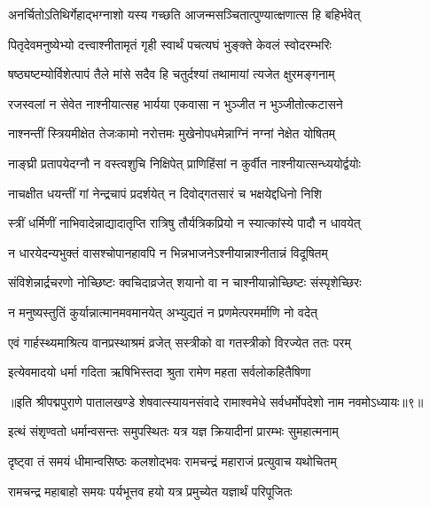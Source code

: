 \twolineshloka
{अनर्चितोऽतिथिर्गेहाद्भग्नाशो यस्य गच्छति}
{आजन्मसञ्चितात्पुण्यात्क्षणात्स हि बहिर्भवेत्}%

\twolineshloka
{पितृदेवमनुष्येभ्यो दत्त्वाश्नीतामृतं गृही}
{स्वार्थं पचत्यघं भुङ्क्ते केवलं स्वोदरम्भरिः}%

\twolineshloka
{षष्ठ्यष्टम्योर्विशेत्पापं तैले मांसे सदैव हि}
{चतुर्दश्यां तथामायां त्यजेत क्षुरमङ्गनाम्}%

\twolineshloka
{रजस्वलां न सेवेत नाश्नीयात्सह भार्यया}
{एकवासा न भुञ्जीत न भुञ्जीतोत्कटासने}%

\twolineshloka
{नाश्नन्तीं स्त्रियमीक्षेत तेजःकामो नरोत्तमः}
{मुखेनोपधमेन्नाग्निं नग्नां नेक्षेत योषितम्}%

\twolineshloka
{नाङ्घ्री प्रतापयेदग्नौ न वस्त्वशुचि निक्षिपेत्}
{प्राणिहिंसां न कुर्वीत नाश्नीयात्सन्ध्ययोर्द्वयोः}%

\twolineshloka
{नाचक्षीत धयन्तीं गां नेन्द्रचापं प्रदर्शयेत्}
{न दिवोद्गतसारं च भक्षयेद्दधिनो निशि}%

\twolineshloka
{स्त्रीं धर्मिणीं नाभिवादेन्नाद्यादातृप्ति रात्रिषु}
{तौर्यत्रिकप्रियो न स्यात्कांस्ये पादौ न धावयेत्}%

\twolineshloka
{न धारयेदन्यभुक्तं वासश्चोपानहावपि}
{न भिन्नभाजनेऽश्नीयान्नाश्नीतान्नं विदूषितम्}%

\twolineshloka
{संविशेन्नार्द्रचरणो नोच्छिष्टः क्वचिदाव्रजेत्}
{शयानो वा न चाश्नीयान्नोच्छिष्टः संस्पृशेच्छिरः}%

\twolineshloka
{न मनुष्यस्तुतिं कुर्यान्नात्मानमवमानयेत्}
{अभ्युद्यतं न प्रणमेत्परमर्माणि नो वदेत्}%

\twolineshloka
{एवं गार्हस्थ्यमाश्रित्य वानप्रस्थाश्रमं व्रजेत्}
{सस्त्रीको वा गतस्त्रीको विरज्येत ततः परम्}%

\twolineshloka
{इत्येवमादयो धर्मा गदिता ऋषिभिस्तदा}
{श्रुता रामेण महता सर्वलोकहितैषिणा}%

॥इति श्रीपद्मपुराणे पातालखण्डे शेषवात्स्यायनसंवादे रामाश्वमेधे सर्वधर्मोपदेशो नाम नवमोऽध्यायः॥९॥



\twolineshloka
{इत्थं संशृण्वतो धर्मान्वसन्तः समुपस्थितः}
{यत्र यज्ञ क्रियादीनां प्रारम्भः सुमहात्मनाम्}%

\twolineshloka
{दृष्ट्वा तं समयं धीमान्वसिष्ठः कलशोद्भवः}
{रामचन्द्रं महाराजं प्रत्युवाच यथोचितम्}%


\twolineshloka
{रामचन्द्र महाबाहो समयः पर्यभूत्तव}
{हयो यत्र प्रमुच्येत यज्ञार्थं परिपूजितः}%

